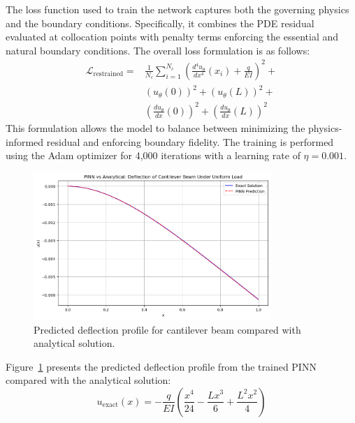 \documentclass[twocolumn]{svjour3}
\begin{document}
	The loss function used to train the network captures both the governing physics and the boundary conditions. Specifically, it combines the PDE residual evaluated at collocation points with penalty terms enforcing the essential and natural boundary conditions. The overall loss formulation is as follows:
	\begin{equation}
	\begin{split}
			\mathcal{L}_{\text{restrained}} = & \frac{1}{N_c}\sum_{i=1}^{N_c} \left( \frac{d^4u_\theta}{dx^4}(x_i) + \frac{q}{EI} \right)^2 + \\
			& \left(u_\theta(0)\right)^2 + \left(u_\theta(L)\right)^2 + \\
			& \left(\frac{du_\theta}{dx}(0)\right)^2 + \left(\frac{du_\theta}{dx}(L)\right)^2
		\end{split}\label{eq:116_restrained}
	\end{equation}
	This formulation allows the model to balance between minimizing the physics-informed residual and enforcing boundary fidelity. The training is performed using the Adam optimizer for 4,000 iterations with a learning rate of $\eta=0.001$.
	
	\begin{figure}[htbp]
		\centering
		\includegraphics[width=0.8\textwidth]{cantilever_results.png}
		\caption{Predicted deflection profile for cantilever beam compared with analytical solution.}\label{fig:cantilever}
	\end{figure}
	
	Figure~\ref{fig:cantilever} presents the predicted deflection profile from the trained PINN compared with the analytical solution:
	\begin{equation}
	u_{\text{exact}}(x) = -\frac{q}{EI}\left(\frac{x^4}{24} - \frac{Lx^3}{6} + \frac{L^2x^2}{4}\right)
			\label{eq:114}
	\end{equation}
\end{document}
